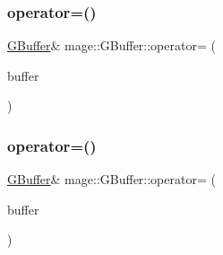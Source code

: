 \hypertarget{structmage_1_1_g_buffer_ac4b12cce6a06866958f3a674d7a7dcae}{}\label{structmage_1_1_g_buffer_ac4b12cce6a06866958f3a674d7a7dcae} 
\subsubsection{\texorpdfstring{operator=()}{operator=()}\hspace{0.1cm}{\footnotesize\ttfamily [1/2]}}
{\footnotesize\ttfamily \hyperlink{structmage_1_1_g_buffer}{G\+Buffer}\& mage\+::\+G\+Buffer\+::operator= (\begin{DoxyParamCaption}\item[{const \hyperlink{structmage_1_1_g_buffer}{G\+Buffer} \&}]{buffer }\end{DoxyParamCaption})\hspace{0.3cm}{\ttfamily [delete]}}

\hypertarget{structmage_1_1_g_buffer_ab1d4ae70de89c0549f54ee76b0b078c3}{}\label{structmage_1_1_g_buffer_ab1d4ae70de89c0549f54ee76b0b078c3} 
\subsubsection{\texorpdfstring{operator=()}{operator=()}\hspace{0.1cm}{\footnotesize\ttfamily [2/2]}}
{\footnotesize\ttfamily \hyperlink{structmage_1_1_g_buffer}{G\+Buffer}\& mage\+::\+G\+Buffer\+::operator= (\begin{DoxyParamCaption}\item[{\hyperlink{structmage_1_1_g_buffer}{G\+Buffer} \&\&}]{buffer }\end{DoxyParamCaption})\hspace{0.3cm}{\ttfamily [delete]}}

\hypertarget{structmage_1_1_g_buffer_aef2fe4c61bb16328228694e69e9a4d9b}{}\label{structmage_1_1_g_buffer_aef2fe4c61bb16328228694e69e9a4d9b} 
